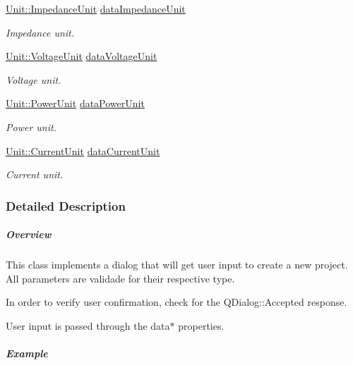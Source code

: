 \begin{DoxyCompactItemize}
\hyperlink{class_unit_a3747e779c805df24a71961290be3fbdf}{Unit\+::\+Impedance\+Unit} \hyperlink{class_new_project_ae50ce899e9b67db0001a11044730a778}{data\+Impedance\+Unit}
\begin{DoxyCompactList}\small\item\em Impedance unit. \end{DoxyCompactList}\item 
\hyperlink{class_unit_a55b07dfa9457e1eca2c7194fe0cfc3c1}{Unit\+::\+Voltage\+Unit} \hyperlink{class_new_project_a04187cd16b01b80dcdef9107e4c83a28}{data\+Voltage\+Unit}
\begin{DoxyCompactList}\small\item\em Voltage unit. \end{DoxyCompactList}\item 
\hyperlink{class_unit_ace265ae255370ccacfd5370337572c3b}{Unit\+::\+Power\+Unit} \hyperlink{class_new_project_a500a8b98942c5f4900348fd315fb9d8b}{data\+Power\+Unit}
\begin{DoxyCompactList}\small\item\em Power unit. \end{DoxyCompactList}\item 
\hyperlink{class_unit_a0794cf6c9682f48296dd4a5315389787}{Unit\+::\+Current\+Unit} \hyperlink{class_new_project_a9d389065ff7f8588338069018088a20f}{data\+Current\+Unit}
\begin{DoxyCompactList}\small\item\em Current unit. \end{DoxyCompactList}\end{DoxyCompactItemize}


\subsubsection{Detailed Description}
\subparagraph*{Overview}

This class implements a dialog that will get user input to create a new project. All parameters are validade for their respective type.

In order to verify user confirmation, check for the Q\+Dialog\+::\+Accepted response.

User input is passed through the data$\ast$ properties.

\subparagraph*{Example}


